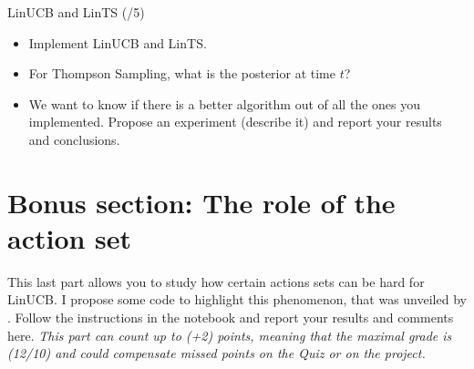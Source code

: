 \begin{problem}{LinUCB and LinTS (/5)}{}
\begin{itemize}
    \item Implement LinUCB and LinTS. 
    \item For Thompson Sampling, what is the posterior at time $t$?
    \item We want to know if there is a better algorithm out of all the ones you implemented. Propose an experiment (describe it) and report your results and conclusions.
\end{itemize}
\end{problem}





\newpage





\appendix

\section{Bonus section: The role of the action set}

This last part allows you to study how certain actions sets can be hard for LinUCB. I propose some code to highlight this phenomenon, that was unveiled by \citet{lattimore2017end}. 
Follow the instructions in the notebook and report your results and comments here. 
\emph{This part can count up to (+2) points, meaning that the maximal grade is (12/10) and could compensate missed points on the Quiz or on the project. }

